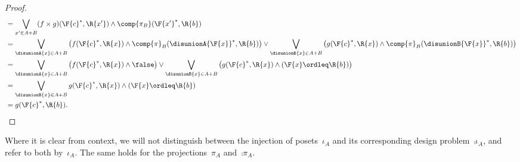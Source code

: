 \begin{proof}
\begin{equation}
\begin{aligned}
            &=\bigvee_{x'\in A+B} (f\times g)(\F{c}^*,\R{x'}) \wedge \comp{\pi_B}(\F{x'}^*,\R{b})\\
            &=\bigvee_{\disunionA{x}\in A+B}\left( f(\F{c}^*,\R{x}) \wedge \comp{\pi}_B(\disunionA{\F{x}}^*,\R{b})\right) \vee
            \bigvee_{\disunionB{x}\in A+B}\left( g(\F{c}^*,\R{x}) \wedge \comp{\pi}_B(\disunionB{\F{x}}^*,\R{b})\right)\\
            &=\bigvee_{\disunionA{x}\in A+B}\left( f(\F{c}^*,\R{x}) \wedge \false \right) \vee
            \bigvee_{\disunionB{x}\in A+B}\left( g(\F{c}^*,\R{x}) \wedge (\F{x}\ordleq \R{b}) \right)\\
            &=\bigvee_{\disunionB{x}\in A+B} g(\F{c}^*,\R{x}) \wedge (\F{x}\ordleq \R{b}) \\
            &=g(\F{c}^*,\R{b}).
        \end{aligned}
    \end{equation}
\end{proof}

\begin{remark}
    Where it is clear from context, we will not distinguish between the injection of posets~$\iota_A$ and its corresponding design problem~$\comp{\iota_A}$, and refer to both by~$\iota_A$. The same holds for the projections~$\pi_A$ and~$\comp{\pi_A}$.
\end{remark}

